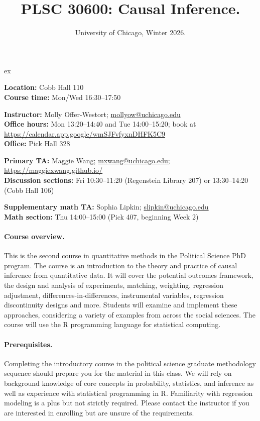 \documentclass[letterpaper, 12pt, parskip=full,DIV=10]{scrartcl}
\title{PLSC 30600: Causal Inference.}
\subtitle{University of Chicago, Winter 2026.}
\begin{document}
\maketitle

 ex

\textbf{Location:} Cobb Hall 110\\
\textbf{Course time:} Mon/Wed 16:30--17:50

\textbf{Instructor:} Molly Offer-Westort; \href{mailto:mollyow@uchicago.edu}{mollyow@uchicago.edu}\\
\textbf{Office hours:} Mon 13:20--14:40 and Tue 14:00--15:20; book at \url{https://calendar.app.google/wmSJFvfyxnDHFK5C9}\\
\textbf{Office:} Pick Hall 328

\textbf{Primary TA:} Maggie Wang; \href{mailto:mxwang@uchicago.edu}{mxwang@uchicago.edu}; \url{https://maggiexwang.github.io/}\\
\textbf{Discussion sections:} Fri 10:30--11:20 (Regenstein Library 207) or 13:30--14:20 (Cobb Hall 106)

\textbf{Supplementary math TA:} Sophia Lipkin; \href{mailto:slipkin@uchicago.edu}{slipkin@uchicago.edu}\\
\textbf{Math section:} Thu 14:00--15:00 (Pick 407, beginning Week 2)

\paragraph{Course overview.} This is the second course in quantitative methods in the Political Science PhD program. The course is an introduction to the theory and practice of causal inference from quantitative data. It will cover the potential outcomes framework, the design and analysis of experiments, matching, weighting, regression adjustment, differences-in-differences, instrumental variables, regression discontinuity designs and more. Students will examine and implement these approaches, considering a variety of examples from across the social sciences. The course will use the R programming language for statistical computing.

\paragraph{Prerequisites.} Completing the introductory course in the political science graduate methodology sequence should prepare you for the material in this class. We will rely on background knowledge of core concepts in probability, statistics, and inference as well as experience with statistical programming in R. Familiarity with regression modeling is a plus but not strictly required. Please contact the instructor if you are interested in enrolling but are unsure of the requirements.
\end{document}
